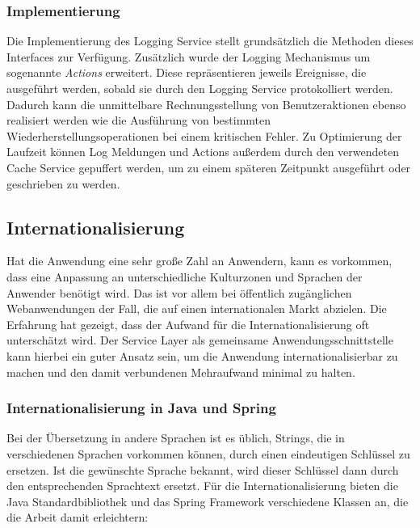 \subsubsection{Implementierung}
Die Implementierung des Logging Service stellt grundsätzlich die Methoden dieses
Interfaces zur Verfügung. Zusätzlich wurde der Logging Mechanismus um sogenannte
\emph{Actions} erweitert. Diese repräsentieren jeweils Ereignisse, die ausgeführt
werden, sobald sie durch den Logging Service protokolliert werden. Dadurch kann
die unmittelbare Rechnungsstellung von Benutzeraktionen ebenso realisiert werden
wie die Ausführung von bestimmten Wiederherstellungsoperationen bei einem
kritischen Fehler. Zu Optimierung der Laufzeit können Log Meldungen und Actions
außerdem durch den verwendeten Cache Service gepuffert werden, um zu einem
späteren Zeitpunkt ausgeführt oder geschrieben zu werden.

\subsection{Internationalisierung}\label{service:i18n}
Hat die Anwendung eine sehr große Zahl an Anwendern, kann es vorkommen, dass eine
Anpassung an unterschiedliche Kulturzonen und Sprachen der Anwender benötigt
wird. Das ist vor allem bei öffentlich zugänglichen Webanwendungen der Fall, die
auf einen internationalen Markt abzielen. Die Erfahrung hat gezeigt, dass der
Aufwand für die Internationalisierung oft unterschätzt wird. Der Service Layer
als gemeinsame Anwendungsschnittstelle kann hierbei ein guter Ansatz sein, um
die Anwendung internationalisierbar zu machen und den damit verbundenen
Mehraufwand minimal zu halten.

\subsubsection{Internationalisierung in Java und Spring}
Bei der Übersetzung in andere Sprachen ist es üblich, Strings, die in
verschiedenen Sprachen vorkommen können, durch einen eindeutigen Schlüssel zu
ersetzen. Ist die gewünschte Sprache bekannt, wird dieser Schlüssel dann durch
den entsprechenden Sprachtext ersetzt. Für die Internationalisierung bieten die
Java Standardbibliothek und das Spring Framework verschiedene Klassen an, die die
Arbeit damit erleichtern:

